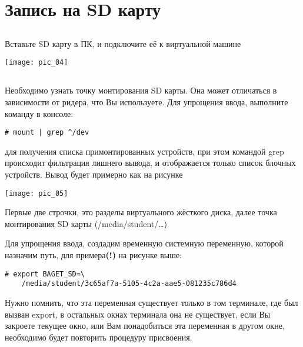 \section{Запись на SD карту}

\subsection{}Вставьте SD карту в ПК, и подключите её к виртуальной машине
\begin{center}
	\texttt{[image: pic\_04]}
\end{center}

\subsection{}Необходимо узнать точку монтирования SD карты. Она может отличаться в зависимости от ридера, что Вы используете. Для упрощения ввода, выполните команду в консоле:
\begin{lstlisting}[style=bash]
	# mount | grep ^/dev
\end{lstlisting}
для получения списка примонтированных устройств, при этом командой grep происходит фильтрация лишнего вывода, и отображается только список блочных устройств. Вывод будет примерно как на рисунке

\begin{center}
	\texttt{[image: pic\_05]}
\end{center}

Первые две строчки, это разделы виртуального жёсткого диска, далее точка монтирования SD карты (/media/student/…)

Для упрощения ввода, создадим временную системную переменную, которой назначим путь, для примера\textbf{(!)} на рисунке выше:
\begin{lstlisting}[style=bash]
	# export BAGET_SD=\
	/media/student/3c65af7a-5105-4c2a-aae5-081235c786d4
\end{lstlisting}

Нужно помнить, что эта переменная существует только в том терминале, где был вызван export, в остальных окнах терминала она не существует, если Вы закроете текущее окно, или Вам понадобиться эта переменная в другом окне, необходимо будет повторить процедуру присвоения.


